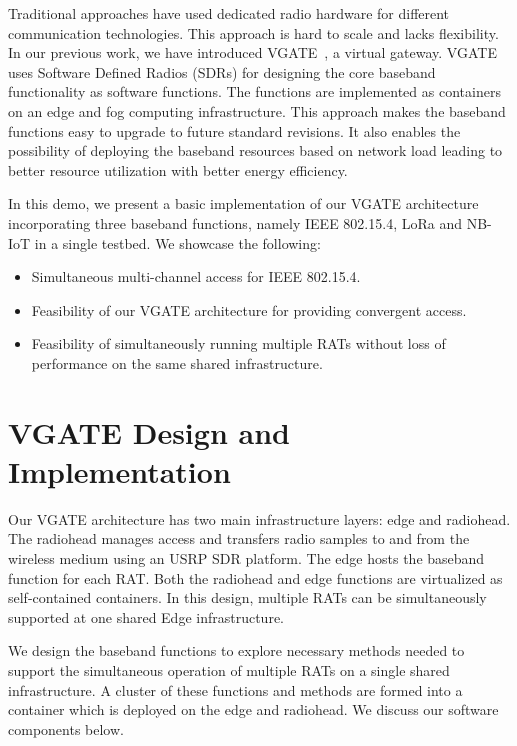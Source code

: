 \documentclass[10pt,emptycopyrightspace]{ewsn-proc}
\begin{document}
Traditional approaches have used dedicated radio hardware for different communication technologies. This approach is hard to scale and lacks flexibility. In our previous work, we have introduced VGATE~\cite{hazra2019handling}, a virtual gateway. VGATE uses Software Defined Radios (SDRs) for designing the core baseband functionality as software functions. The functions are implemented as containers on an edge and fog computing infrastructure. This approach makes the baseband functions easy to upgrade to future standard revisions.  It also enables the possibility of deploying the baseband resources based on network load leading to better resource utilization with better energy efficiency.


In this demo, we present a basic implementation of our VGATE architecture incorporating three baseband functions, namely IEEE 802.15.4, LoRa and NB-IoT in a single testbed. We showcase the following:
\begin{itemize}
	\item Simultaneous multi-channel access for IEEE 802.15.4.
	\item Feasibility of our VGATE architecture for providing convergent access.
	\item Feasibility of simultaneously running multiple RATs without loss of performance on the same shared infrastructure.
\end{itemize}

\section{VGATE Design and Implementation}
\label{sec:implementation}
Our VGATE architecture
has two main infrastructure layers: edge and radiohead. The radiohead manages access and transfers radio samples to and from the wireless medium using an USRP SDR platform.  The edge hosts the baseband function for each RAT. Both the radiohead and edge functions are virtualized as self-contained containers. In this design, multiple RATs can be simultaneously supported at one shared Edge
infrastructure. %


We design the baseband functions to explore necessary methods needed to support the simultaneous operation of multiple RATs on a single shared infrastructure. A cluster of these functions and methods are formed into a container which is deployed on the edge and radiohead. We discuss our software components below. 
\end{document}
